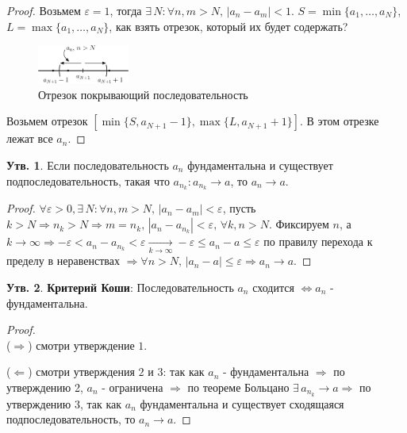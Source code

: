 \documentclass[12pt]{article}
\theoremstyle{definition}
\newtheorem{prop}{Утв.}
\begin{document}
\begin{proof}
	Возьмем $\varepsilon = 1$, тогда $\exists \, N \colon \forall n, m > N, \, |a_n - a_m| < 1$. $S = \min \{a_1, \dotsc, a_N\}$, $L = \max\{a_1, \dotsc, a_N\}$, как взять отрезок, который их будет содержать?
	
	\begin{figure}[H]
		\centering
		\includegraphics[width=0.27\textwidth]{10_2.eps}
		\caption{Отрезок покрывающий последовательность}
		\label{10_2}
	\end{figure}
	
	Возьмем отрезок $[\min\{S, a_{N+1} -1\}, \max\{L,a_{N+1}+1\}]$. В этом отрезке лежат все $a_n$.
\end{proof}

\begin{prop}
	Если последовательность $a_n$ фундаментальна и существует подпоследовательность, такая что $a_{n_k} \colon a_{n_k} \to a$, то $a_n \to a$.
\end{prop}

\begin{proof}
	$\forall \varepsilon > 0, \exists \, N \colon \forall n,m > N, \, |a_n - a_m| < \varepsilon$, пусть $k > N \Rightarrow n_k > N \Rightarrow m = n_k, \, |a_n - a_{n_k}| < \varepsilon, \, \forall k, n > N$. Фиксируем $n$, а $k \to \infty \Rightarrow  -\varepsilon < a_n - a_{n_k} < \varepsilon \xrightarrow[k \to \infty]{} -\varepsilon \leq a_n - a \leq \varepsilon$ по правилу перехода к пределу в неравенствах $\Rightarrow \forall n > N, \, |a_n - a| \leq \varepsilon \Rightarrow a_n \to a$.	
\end{proof}

\begin{prop}
	\textbf{Критерий Коши}: Последовательность $a_n$ сходится $\Leftrightarrow a_n$ - фундаментальна.
\end{prop}

\begin{proof}\hfill\\
	($\Rightarrow$) смотри утверждение $1$.
	
	($\Leftarrow$) смотри утверждения $2$ и $3$: так как $a_n$ - фундаментальна $\Rightarrow$ по утверждению 2, $a_n$ - ограничена $\Rightarrow$ по теореме Больцано $\exists \, a_{n_k} \to a \Rightarrow$ по утверждению 3, так как $a_n$ фундаментальна и существует сходящаяся подпоследовательность, то $a_n \to a$. 
\end{proof}
\end{document}

